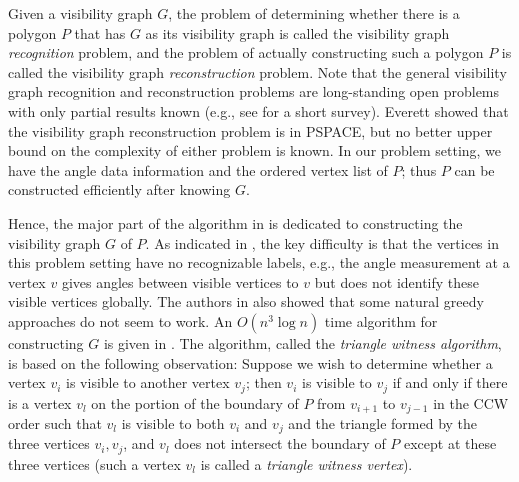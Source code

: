 \documentclass[11pt]{article}
\begin{document}
Given a visibility
graph $G$, the problem of determining whether there is a polygon $P$
that has $G$ as its visibility graph is called the visibility graph
{\em recognition} problem, and the problem of actually constructing
such a polygon $P$ is called the visibility graph {\em reconstruction} problem. 
Note that the general visibility graph recognition and reconstruction
problems are long-standing open problems with only partial results known
(e.g., see \cite{ref:AsanoVi00} for a short survey). Everett
\cite{ref:EverettVi90} showed that the visibility graph reconstruction
problem is in PSPACE, but no better upper bound on the complexity of
either problem is known. In our problem setting, we have the
angle data information and the ordered vertex list of $P$; thus
$P$ can be constructed efficiently after knowing $G$. 


Hence, the major part of the algorithm in \cite{ref:DisserRe10} is
dedicated to constructing the visibility graph $G$ of $P$.
As indicated in \cite{ref:DisserRe10}, the key difficulty 
is that the vertices in this
problem setting have no recognizable labels, e.g., the angle
measurement at a vertex $v$ gives angles between visible vertices to
$v$ but does not identify these visible vertices globally. 
The authors in \cite{ref:DisserRe10} also showed that some natural greedy
approaches do not seem to work. An $O(n^3\log n)$ time algorithm for
constructing $G$ is given in \cite{ref:DisserRe10}. The algorithm, 
called the {\em triangle witness algorithm}, is based
on the following observation: Suppose we wish to determine whether a
vertex $v_i$ is visible to another vertex $v_j$; then $v_i$ is
visible to $v_j$ if and only if there is a vertex $v_l$ on the portion of
the boundary of $P$ from $v_{i+1}$ to $v_{j-1}$ in the CCW order such
that $v_l$ is visible to both $v_i$ and $v_j$ and the triangle formed
by the three vertices $v_i,v_j$, and $v_l$ does not intersect the
boundary of $P$
except at these three vertices (such a vertex $v_l$ is called a {\em triangle
witness vertex}). 
\end{document}
